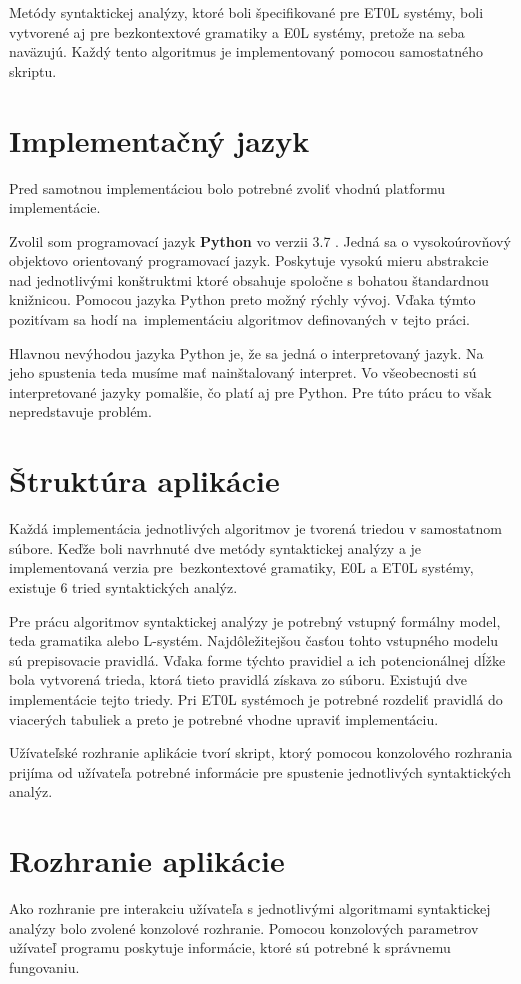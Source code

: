 Metódy syntaktickej analýzy, ktoré boli špecifikované pre ET0L systémy, boli vytvorené aj pre bezkontextové gramatiky a E0L systémy, pretože na seba naväzujú. Každý tento algoritmus je implementovaný pomocou samostatného skriptu.

\section{Implementačný jazyk}
Pred samotnou implementáciou bolo potrebné zvoliť vhodnú platformu implementácie.

Zvolil som programovací jazyk \textbf{Python} vo verzii 3.7 . Jedná sa o vysokoúrovňový objektovo orientovaný programovací jazyk. Poskytuje vysokú mieru abstrakcie nad jednotlivými konštruktmi ktoré obsahuje spoločne s bohatou štandardnou knižnicou. Pomocou jazyka Python preto možný rýchly vývoj. Vďaka týmto pozitívam sa hodí na~implementáciu algoritmov definovaných v tejto práci.

Hlavnou nevýhodou jazyka Python je, že sa jedná o interpretovaný jazyk. Na jeho spustenia teda musíme mať nainštalovaný interpret. Vo všeobecnosti sú interpretované jazyky pomalšie, čo platí aj pre Python. Pre túto prácu to však nepredstavuje problém.


\section{Štruktúra aplikácie}
Každá implementácia jednotlivých algoritmov je tvorená triedou v samostatnom súbore. Keďže boli navrhnuté dve metódy syntaktickej analýzy a je implementovaná verzia pre~bezkontextové gramatiky, E0L a ET0L systémy, existuje 6 tried syntaktických analýz.

Pre prácu algoritmov syntaktickej analýzy je potrebný vstupný formálny model, teda gramatika alebo L-systém. Najdôležitejšou časťou tohto vstupného modelu sú prepisovacie pravidlá. Vďaka forme týchto pravidiel a ich potencionálnej dĺžke bola vytvorená trieda, ktorá tieto pravidlá získava zo súboru. Existujú dve implementácie tejto triedy. Pri ET0L systémoch je potrebné rozdeliť pravidlá do viacerých tabuliek a preto je potrebné vhodne upraviť implementáciu.

Užívateľské rozhranie aplikácie tvorí skript, ktorý pomocou konzolového rozhrania prijíma od užívateľa potrebné informácie pre spustenie jednotlivých syntaktických analýz.

\section{Rozhranie aplikácie}
Ako rozhranie pre interakciu užívateľa s jednotlivými algoritmami syntaktickej analýzy bolo zvolené konzolové rozhranie. Pomocou konzolových parametrov užívateľ programu poskytuje informácie, ktoré sú potrebné k správnemu fungovaniu. 


